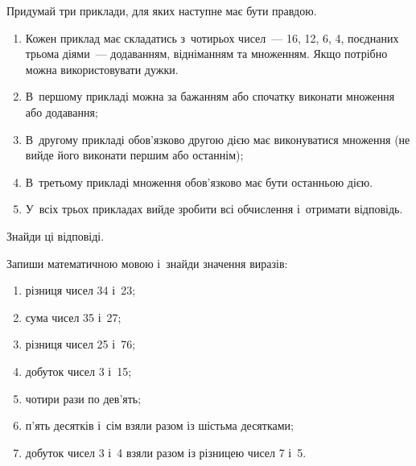 \problem
Придумай три приклади, для яких наступне має бути правдою.
\begin{enumerate}
    \item Кожен приклад має складатись з~чотирьох чисел~--- 16, 12, 6, 4,
    поєднаних трьома діями~--- додаванням, відніманням та множенням.
    Якщо потрібно можна використовувати дужки.
    \item В~першому прикладі можна за бажанням або
    спочатку виконати множення або додавання;
    \item В~другому прикладі обов'язково другою дією має
    виконуватися множення (не вийде його виконати першим або останнім);
    \item В~третьому прикладі множення обов'язково має бути останньою дією.
    \item У~всіх трьох прикладах вийде зробити всі обчислення і~отримати відповідь.
\end{enumerate}
Знайди ці відповіді.


\problem
Запиши математичною мовою і~знайди значення виразів:
\begin{enumerate}
    \item різниця чисел 34 і~23;
    \item сума чисел 35 і~27;
    \item різниця чисел 25 і~76;
    \item добуток чисел 3 і~15;
    \item чотири рази по дев'ять;
    \item п'ять десятків і~сім взяли разом із шістьма десятками;
    \item добуток чисел 3 і~4 взяли разом із різницею чисел 7 і~5.
\end{enumerate}


